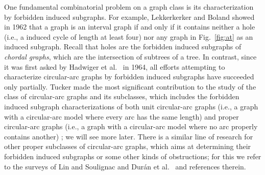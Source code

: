 \documentclass[10pt]{article}
\begin{document}
\begin{figure*}[h]
  \centering\footnotesize
  
  
  
  \caption{Chordal minimal forbidden induced graphs.}
  \label{fig:at}
\end{figure*}

One fundamental combinatorial problem on a graph class is its
characterization by forbidden induced subgraphs.  For example,
Lekkerkerker and Boland \cite{lekkerkerker-62-interval-graphs} showed
in 1962 that a graph is an interval graph if and only if it contains
neither a hole (i.e., a induced cycle of length at least four) nor any
graph in Fig.~\ref{fig:at} as an induced subgraph.  Recall that holes
are the forbidden induced subgraphs of \emph{chordal graphs}, which
are the intersection of subtrees of a tree.  In contrast, since it was
first asked by Hadwiger et
al.~\cite{hadwiger-64-combinatorial-geometry} in 1964, all efforts
attempting to characterize circular-arc graphs by forbidden induced
subgraphs have succeeded only partially.  Tucker made the most
significant contribution to the study of the class of circular-arc
graphs and its subclasses, which includes the forbidden induced
subgraph characterizations of both unit circular-arc graphs (i.e., a
graph with a circular-arc model where every arc has the same length)
and proper circular-arc graphs (i.e., a graph with a circular-arc
model where no arc properly contains another)
\cite{tucker-74-structures-cag}; we will see more later.  There is a
similar line of research for other proper subclasses of circular-arc
graphs, which aims at determining their forbidden induced subgraphs or
some other kinds of obstructions; for this we refer to the surveys of
Lin and Soulignac \cite{lin-09-cag-and-subclasses} and Dur\'an et
al.~\cite{duran-14-survey} and references therein.
\end{document}
